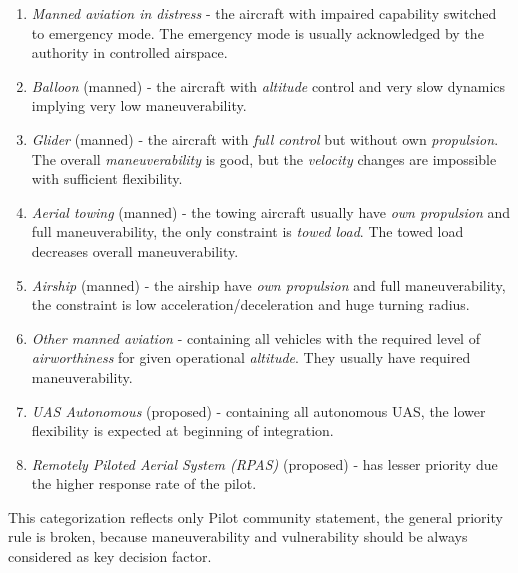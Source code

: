 \begin{enumerate}
    \item \emph{Manned aviation in distress} \cite{icaoAnnex2} -  the aircraft with impaired capability switched to emergency mode. The emergency mode is usually acknowledged by the authority in controlled airspace. 
    
    \item \emph{Balloon} (manned) \cite{icaoAnnex2} - the aircraft with \emph{altitude} control and very slow dynamics implying very low maneuverability.  
    
    \item \emph{Glider} (manned) \cite{icaoAnnex2} - the aircraft with \emph{full control} but without own \emph{propulsion}. The overall \emph{maneuverability} is good, but the \emph{velocity} changes are impossible with sufficient flexibility.
    
    \item \emph{Aerial towing} (manned) \cite{icaoAnnex2} - the towing aircraft usually have \emph{own propulsion} and full maneuverability, the only constraint is \emph{towed load}. The towed load decreases overall maneuverability.
    
    \item \emph{Airship} (manned) \cite{icaoAnnex2} - the airship have \emph{own propulsion} and full maneuverability, the constraint is low acceleration/deceleration and huge turning radius.
    
    \item \emph{Other manned aviation} \cite{icaoAnnex2} - containing all vehicles with the required level of \emph{airworthiness} for given operational \emph{altitude}. They usually have required maneuverability.
    
    \item \emph{UAS Autonomous} (proposed) \cite{santiago2015pilot} - containing all autonomous UAS, the lower flexibility is expected at beginning of integration.
    
    \item \emph{Remotely Piloted Aerial System (RPAS)} (proposed)  \cite{santiago2015pilot} - has lesser priority due the higher response rate of the pilot.
\end{enumerate}

\begin{note}
    This categorization reflects only Pilot community statement, the general priority rule is broken, because maneuverability and vulnerability  should be always considered as key decision factor. 
\end{note}


